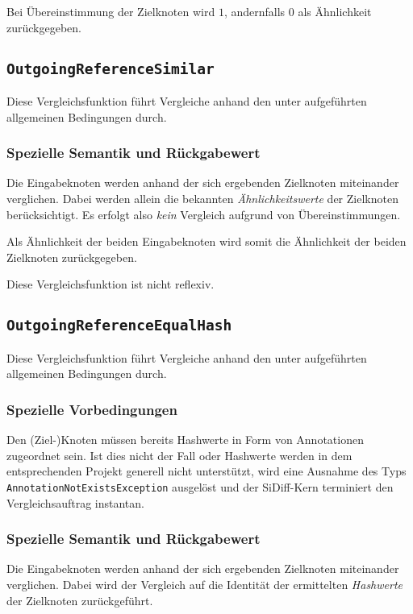Bei Übereinstimmung der Zielknoten wird $1$, andernfalls $0$ als Ähnlichkeit zurückgegeben.


%
%
\subsection{\texttt{OutgoingReferenceSimilar}}
Diese Vergleichsfunktion führt Vergleiche anhand den unter\mylinebreak{} aufgeführten allgemeinen Bedingungen durch.

\subsubsection*{Spezielle Semantik und Rückgabewert}
Die Eingabeknoten werden anhand der sich ergebenden Zielknoten miteinander verglichen. Dabei werden allein die bekannten \emph{Ähnlichkeitswerte} der Zielknoten berücksichtigt. Es erfolgt also \emph{kein} Vergleich aufgrund von Übereinstimmungen.

Als Ähnlichkeit der beiden Eingabeknoten wird somit die Ähnlichkeit der beiden Zielknoten zurückgegeben.

 Diese Vergleichsfunktion ist nicht reflexiv.


\newpage
%
%
\subsection{\texttt{OutgoingReferenceEqualHash}}
Diese Vergleichsfunktion führt Vergleiche anhand den unter\mylinebreak{} aufgeführten allgemeinen Bedingungen durch.

\subsubsection*{Spezielle Vorbedingungen}
Den (Ziel-)Knoten müssen bereits Hashwerte in Form von Annotationen zugeordnet sein. Ist dies nicht der Fall oder Hashwerte werden in dem entsprechenden Projekt generell nicht unterstützt, wird eine Ausnahme des Typs \texttt{AnnotationNotExistsException} ausgelöst und der SiDiff-Kern terminiert den Vergleichsauftrag instantan.

\subsubsection*{Spezielle Semantik und Rückgabewert}
Die Eingabeknoten werden anhand der sich ergebenden Zielknoten miteinander verglichen. Dabei wird der Vergleich auf die Identität der ermittelten \emph{Hashwerte} der Zielknoten zurückgeführt.

